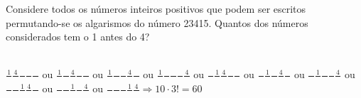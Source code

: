 \begin{ex}
 Considere todos os números inteiros positivos que podem ser escritos permutando-se os algarismos do número 23415. Quantos dos números considerados tem o 1 antes do 4?
   \begin{sol}
     \phantom{A} \\
     $\frac{1}{\phantom{A}}\frac{4}{\phantom{A}}\frac{\phantom{A}}{\phantom{A}}\frac{\phantom{A}}{\phantom{A}}\frac{\phantom{A}}{\phantom{A}}$ ou $\frac{1}{\phantom{A}}\frac{\phantom{A}}{\phantom{A}}\frac{4}{\phantom{A}}\frac{\phantom{A}}{\phantom{A}}\frac{\phantom{A}}{\phantom{A}}$ ou $\frac{1}{\phantom{A}}\frac{\phantom{A}}{\phantom{A}}\frac{\phantom{A}}{\phantom{A}}\frac{4}{\phantom{A}}\frac{\phantom{A}}{\phantom{A}}$ ou
     $\frac{1}{\phantom{A}}\frac{\phantom{A}}{\phantom{A}}\frac{\phantom{A}}{\phantom{A}}\frac{\phantom{A}}{\phantom{A}}\frac{4}{\phantom{A}}$ ou
     $\frac{\phantom{A}}{\phantom{A}}\frac{1}{\phantom{A}}\frac{4}{\phantom{A}}\frac{\phantom{A}}{\phantom{A}}\frac{\phantom{A}}{\phantom{A}}$ ou
     $\frac{\phantom{A}}{\phantom{A}}\frac{1}{\phantom{A}}\frac{\phantom{A}}{\phantom{A}}\frac{4}{\phantom{A}}\frac{\phantom{A}}{\phantom{A}}$ ou
     $\frac{\phantom{A}}{\phantom{A}}\frac{1}{\phantom{A}}\frac{\phantom{A}}{\phantom{A}}\frac{\phantom{A}}{\phantom{A}}\frac{4}{\phantom{A}}$ ou 
     $\frac{\phantom{A}}{\phantom{A}}\frac{\phantom{A}}{\phantom{A}}\frac{1}{\phantom{A}}\frac{4}{\phantom{A}}\frac{\phantom{A}}{\phantom{A}}$ ou
     $\frac{\phantom{A}}{\phantom{A}}\frac{\phantom{A}}{\phantom{A}}\frac{1}{\phantom{A}}\frac{\phantom{A}}{\phantom{A}}\frac{4}{\phantom{A}}$ ou
     $\frac{\phantom{A}}{\phantom{A}}\frac{\phantom{A}}{\phantom{A}}\frac{\phantom{A}}{\phantom{A}}\frac{1}{\phantom{A}}\frac{4}{\phantom{A}}\Longrightarrow 10\cdot3!=60$
     
   \end{sol}
\end{ex}
